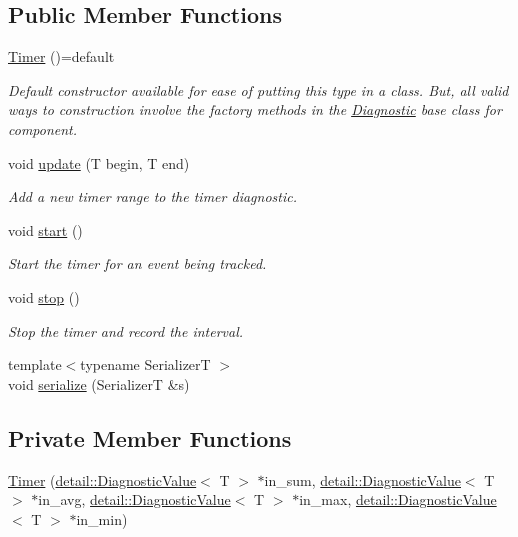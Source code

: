 \subsection*{Public Member Functions}
\begin{DoxyCompactItemize}
\item 
\hyperlink{structvt_1_1runtime_1_1component_1_1meter_1_1_timer_af32ee3397a43cd6af675904d70295211}{Timer} ()=default
\begin{DoxyCompactList}\small\item\em Default constructor available for ease of putting this type in a class. But, all valid ways to construction involve the factory methods in the {\ttfamily \hyperlink{structvt_1_1runtime_1_1component_1_1_diagnostic}{Diagnostic}} base class for component. \end{DoxyCompactList}\item 
void \hyperlink{structvt_1_1runtime_1_1component_1_1meter_1_1_timer_a04aed118756cd5e95ce1f264978effc2}{update} (T begin, T end)
\begin{DoxyCompactList}\small\item\em Add a new timer range to the timer diagnostic. \end{DoxyCompactList}\item 
void \hyperlink{structvt_1_1runtime_1_1component_1_1meter_1_1_timer_a685bd06e9e97de01cf8948dec7d59462}{start} ()
\begin{DoxyCompactList}\small\item\em Start the timer for an event being tracked. \end{DoxyCompactList}\item 
void \hyperlink{structvt_1_1runtime_1_1component_1_1meter_1_1_timer_a302a9e413a1188b3a30ece1905123249}{stop} ()
\begin{DoxyCompactList}\small\item\em Stop the timer and record the interval. \end{DoxyCompactList}\item 
{\footnotesize template$<$typename SerializerT $>$ }\\void \hyperlink{structvt_1_1runtime_1_1component_1_1meter_1_1_timer_a4462112eaf78f9dec18de88d9c4c93f4}{serialize} (SerializerT \&s)
\end{DoxyCompactItemize}
\subsection*{Private Member Functions}
\begin{DoxyCompactItemize}
\item 
\hyperlink{structvt_1_1runtime_1_1component_1_1meter_1_1_timer_afc814a211d7354cad6e64783e1f8fe8a}{Timer} (\hyperlink{structvt_1_1runtime_1_1component_1_1detail_1_1_diagnostic_value}{detail\+::\+Diagnostic\+Value}$<$ T $>$ $\ast$in\+\_\+sum, \hyperlink{structvt_1_1runtime_1_1component_1_1detail_1_1_diagnostic_value}{detail\+::\+Diagnostic\+Value}$<$ T $>$ $\ast$in\+\_\+avg, \hyperlink{structvt_1_1runtime_1_1component_1_1detail_1_1_diagnostic_value}{detail\+::\+Diagnostic\+Value}$<$ T $>$ $\ast$in\+\_\+max, \hyperlink{structvt_1_1runtime_1_1component_1_1detail_1_1_diagnostic_value}{detail\+::\+Diagnostic\+Value}$<$ T $>$ $\ast$in\+\_\+min)
\end{DoxyCompactItemize}
